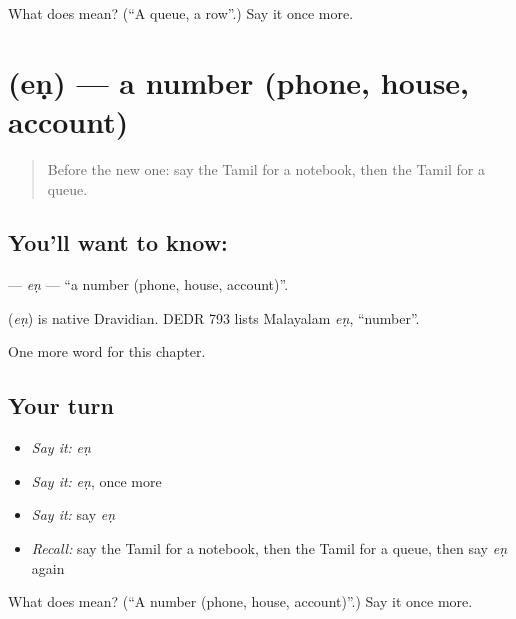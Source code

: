 \begin{tcolorbox}[breakable,colback=teal!4,colframe=teal!35!black,title={Before you move on}]
What does  mean? (\textquotedblleft{}A queue, a row\textquotedblright{}.) Say it once more.
\end{tcolorbox}
\section[\texorpdfstring{\ta{எண்} (eṇ)}{எண் (eṇ)}]{ (eṇ) — a number (phone, house, account)}

\label{lesson:TA-C185-en}



\begin{quote}
Before the new one: say the Tamil for a notebook, then the Tamil for a queue.
\end{quote}

\subsection*{You'll want to know: }
\textbf{} — \emph{eṇ} — \textquotedblleft{}a number (phone, house, account)\textquotedblright{}.

\begin{cousinweb}
\textbf{} (\emph{eṇ}) is native Dravidian. DEDR 793 lists Malayalam \emph{eṇ}, \textquotedblleft{}number\textquotedblright{}.
\end{cousinweb}

\begin{grammarlens}[title={What you've built}]
One more word for this chapter.
\end{grammarlens}

\subsection*{Your turn}
\begin{itemize}
\raggedright
  \item \emph{Say it:} \emph{eṇ}
  \item \emph{Say it:} \emph{eṇ}, once more
  \item \emph{Say it:} say \emph{eṇ}
  \item \emph{Recall:} say the Tamil for a notebook, then the Tamil for a queue, then say \emph{eṇ} again
\end{itemize}

\begin{tcolorbox}[breakable,colback=teal!4,colframe=teal!35!black,title={Before you move on}]
What does  mean? (\textquotedblleft{}A number (phone, house, account)\textquotedblright{}.) Say it once more.
\end{tcolorbox}
